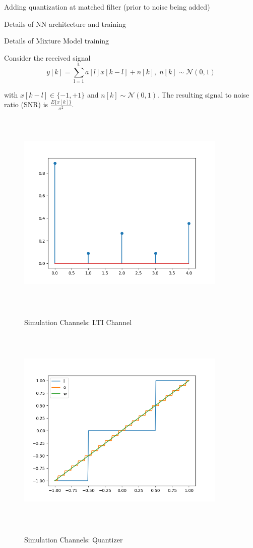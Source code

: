 \documentclass[12pt,a4paper]{article}
\begin{document}
Adding quantization at matched filter (prior to noise being added)


Details of NN architecture and training

Details of Mixture Model training


Consider the received signal 
\begin{equation}
y[k] = \sum_{\mathrm{l=1}}^{\mathrm{L}} a[l]x[k-l] + n[k], \; n[k]  \sim \mathcal{N}(0,1)
\end{equation}

with $x[k-l] \in \{ -1, +1\}$ and $n[k]  \sim \mathcal{N}(0,1)$.  
The resulting signal to noise ratio (SNR) is 
$\frac{E\{x[k]\}}{\sigma^2}$.


\begin{figure}[H]
\centering
	  \caption{Simulation Channels: LTI Channel}
	\includegraphics[width=10cm,height = 10cm]{system_model/lti_channel}
	  \label{fig:LTI Channel}
\end{figure}
\begin{figure}[H]
	  \caption{Simulation Channels: Quantizer}
	\includegraphics[width=10cm,height = 10cm]{system_model/quantizer}
	  \label{fig:Quantized Channel}
\end{figure}
\end{document}
